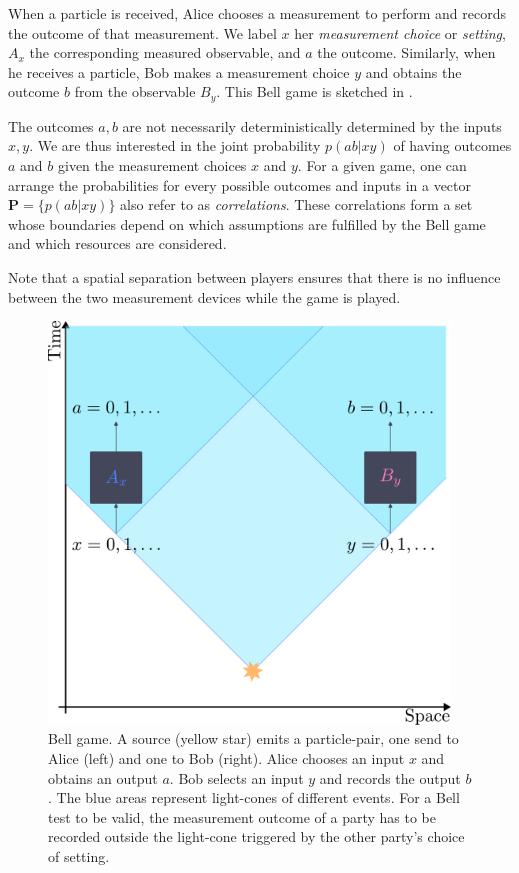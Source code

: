 When a particle is received, Alice chooses a measurement to perform and records the outcome of that measurement.
We label $x$ her \textit{measurement choice} or \textit{setting}, $A_x$ the corresponding measured observable, and $a$ the outcome.
Similarly, when he receives a particle, Bob makes a measurement choice $y$ and obtains the outcome $b$ from the observable $B_y$.
This Bell game is sketched in .

The outcomes $a,b$ are not necessarily deterministically determined by the inputs $x,y$. 
We are thus interested in the joint probability $p(ab|xy)$ of having outcomes $a$ and $b$ given the measurement choices $x$ and $y$. 
For a given game, one can arrange the probabilities for every possible outcomes and inputs in a vector $\mathbf{P}=\{ p(ab|xy)\}$ also refer to as \textit{correlations}.
These correlations form a set whose boundaries depend on which assumptions are fulfilled by the Bell game and which resources are considered.

Note that a spatial separation between players ensures that there is no influence between the two measurement devices while the game is played.

\begin{figure}
	\begin{center}
		\includegraphics[width=0.95\textwidth]{chapters/overview/img/belltest.pdf}
	\end{center}
	\caption{Bell game. A source (yellow star) emits a particle-pair, one send to Alice (left) and one to Bob (right). Alice chooses an input $x$ and obtains an output $a$. Bob selects an input $y$ and records the output $b$. The blue areas represent light-cones of different events. For a Bell test to be valid, the measurement outcome of a party has to be recorded outside the light-cone triggered by the other party's choice of setting. }
	\label{fig:belltest}
\end{figure}


